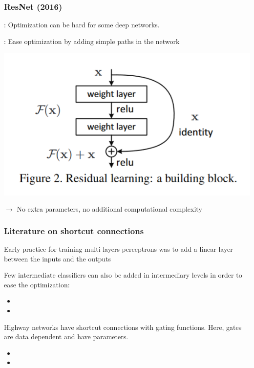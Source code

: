 \begin{frame}
	\frametitle{ResNet (2016)}


	\bigskip

	: Optimization can be hard for some deep networks.

	\bigskip

	: Ease optimization by adding simple paths in the network

	\bigskip

	\begin{center}
		\includegraphics[scale=0.7]{figs/ResNet_IdentityBlock}
	\end{center}

	\medskip
	$\rightarrow$ No extra parameters, no additional computational complexity
\end{frame}

\begin{frame}
	\frametitle{Literature on shortcut connections}

	Early practice for training multi layers perceptrons was to add a linear layer between the inputs and the outputs


	\bigskip

	Few intermediate classifiers can also be added in intermediary levels in order to ease the optimization:
	\begin{itemize}
		\item 	{}
		\item 	{}
	\end{itemize}

	\bigskip

	Highway networks have shortcut connections with gating functions.
	Here, gates are data dependent and have parameters.

	\begin{itemize}
		\item {}
		\item {}
	\end{itemize}

\end{frame}

